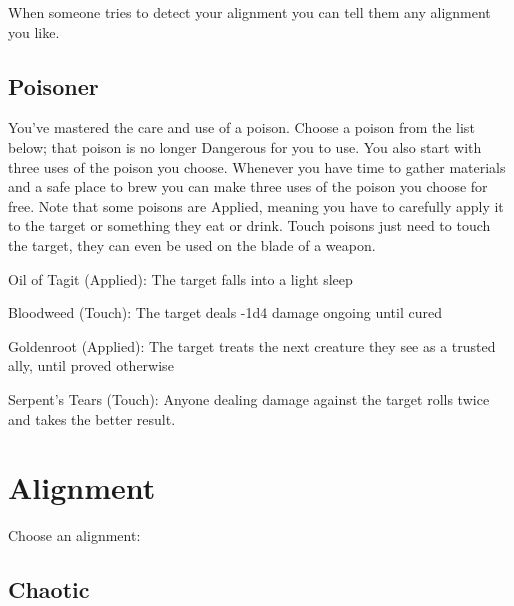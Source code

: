 When someone tries to detect your alignment you can tell them any alignment you like.

           
\subsection{Poisoner}   
           

You've mastered the care and use of a poison. Choose a poison from the list below; that poison is no longer Dangerous for you to use. You also start with three uses of the poison you choose. Whenever you have time to gather materials and a safe place to brew you can make three uses of the poison you choose for free. Note that some poisons are Applied, meaning you have to carefully apply it to the target or something they eat or drink. Touch poisons just need to touch the target, they can even be used on the blade of a weapon.

           
\startitemize[1,packed]
             
\item Oil of Tagit (Applied): The target falls into a light sleep

             
\item Bloodweed (Touch): The target deals -1d4 damage ongoing until cured

             
\item Goldenroot (Applied): The target treats the next creature they see as a trusted ally, until proved otherwise

             
\item Serpent's Tears (Touch): Anyone dealing damage against the target rolls twice and takes the better result.

           
\stopitemize
         

       

       
\section{Alignment}   
       
\startInstructionsAfterHeader
Choose an alignment:
\stopInstructionsAfterHeader
       

         
\subsection{Chaotic}   
         

